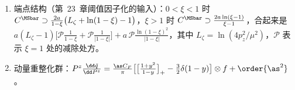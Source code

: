 \begin{proposition}
\begin{enumerate}[label=(\alph*),leftmargin=2em,itemsep=2pt,topsep=2pt]
\begin{equation}
\end{equation}
\begin{equation}\label{eq:lamet-Cratio}
C^{\rm ratio}(\xi)=\delta(1-\xi)+a\begin{cases}\big[\frac{1+\xi^2}{1-\xi}\ln\frac\xi{\xi-1}+1-\frac3{2(1-\xi)}\big]^{[1,\infty]}_{+(1)},&\xi>1\\[3pt]\big[\frac{1+\xi^2}{1-\xi}\big(-\ell_p+\ln(\xi(1-\xi))-1\big)+1+\frac3{2(1-\xi)}\big]^{[0,1]}_{+(1)},&0<\xi<1\\[3pt]\big[-\frac{1+\xi^2}{1-\xi}\ln\frac{-\xi}{1-\xi}-1+\frac3{2(1-\xi)}\big]^{[-\infty,0]}_{+(1)},&\xi<0\end{cases}
\end{equation}%
对 $\gamma^z$，$\MSbar$ 核加 $2a(1-\xi)\theta(0<\xi<1)$，比值核加 $a[2(1-\xi)]^{[0,1]}_{+(1)}$。
\item 端点结构（第~23~章阈值因子化的输入）：$0<\xi<1$ 时 $C^{\MSbar}\supset\frac{2a}{1-\xi}\big(L_\zeta+\ln(1-\xi)-1\big)$，$\xi>1$ 时 $C^{\MSbar}\supset\frac{2a\ln(\xi-1)}{\xi-1}$，合起来是
$a(L_\zeta-1)\big[\mathcal P\frac1{1-\xi}+\mathcal P\frac1{|1-\xi|}\big]+a\,\mathcal P\frac{\ln(1-\xi)^2}{|1-\xi|}$，其中 $L_\zeta=\ln(4p_z^2/\mu^2)$，$\mathcal P$ 表示 $\xi=1$ 处的减除处方。
\item 动量重整化群：$P^z\frac{\dd\tilde q}{\dd P^z}=\frac{\as C_F}\pi\big[\big[\frac{1+y^2}{1-y}\big]_+-\frac32\delta(1-y)\big]\otimes f+\order{\as^2}$。
\end{enumerate}
\end{proposition}

